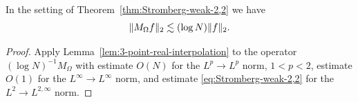 \begin{corollary}
\label{cor:Stromberg-strong-2,2}
In the setting of Theorem~\ref{thm:Stromberg-weak-2,2} we have
\[
\lVert M_{\Omega} f \rVert_{2} \lesssim (\log N) \lVert f \rVert_{2}.
\]
\end{corollary}
\begin{proof}
Apply Lemma~\ref{lem:3-point-real-interpolation} to the operator $(\log N)^{-1} M_{\Omega}$ with estimate $O(N)$ for the $L^{p}\to L^{p}$ norm, $1<p<2$, estimate $O(1)$ for the $L^{\infty} \to L^{\infty}$ norm, and estimate \eqref{eq:Stromberg-weak-2,2} for the $L^{2} \to L^{2,\infty}$ norm.
\end{proof}

